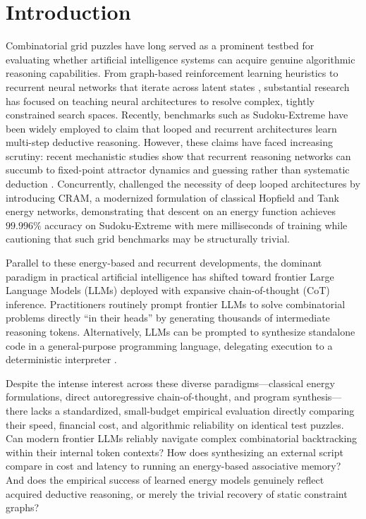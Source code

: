 \documentclass{article} %
\begin{document}
\section{Introduction}
\label{sec:intro}
Combinatorial grid puzzles have long served as a prominent testbed for evaluating whether artificial intelligence systems can acquire genuine algorithmic reasoning capabilities. From graph-based reinforcement learning heuristics \citep{Dai2017LearningCombinatorial} to recurrent neural networks that iterate across latent states \citep{Yang2023LearningSolve}, substantial research has focused on teaching neural architectures to resolve complex, tightly constrained search spaces. Recently, benchmarks such as Sudoku-Extreme have been widely employed to claim that looped and recurrent architectures learn multi-step deductive reasoning. However, these claims have faced increasing scrutiny: recent mechanistic studies show that recurrent reasoning networks can succumb to fixed-point attractor dynamics and guessing rather than systematic deduction \citep{Ren2026YourReasoning}. Concurrently, \citet{Hoover2026ClassicalEnergies} challenged the necessity of deep looped architectures by introducing CRAM, a modernized formulation of classical Hopfield and Tank energy networks, demonstrating that descent on an energy function achieves $99.996\%$ accuracy on Sudoku-Extreme with mere milliseconds of training while cautioning that such grid benchmarks may be structurally trivial.

Parallel to these energy-based and recurrent developments, the dominant paradigm in practical artificial intelligence has shifted toward frontier Large Language Models (LLMs) deployed with expansive chain-of-thought (CoT) inference. Practitioners routinely prompt frontier LLMs to solve combinatorial problems directly ``in their heads'' by generating thousands of intermediate reasoning tokens. Alternatively, LLMs can be prompted to synthesize standalone code in a general-purpose programming language, delegating execution to a deterministic interpreter \citep{Gao2022PalProgramaided, Pan2023LogiclmEmpowering}. 

Despite the intense interest across these diverse paradigms—classical energy formulations, direct autoregressive chain-of-thought, and program synthesis—there lacks a standardized, small-budget empirical evaluation directly comparing their speed, financial cost, and algorithmic reliability on identical test puzzles. Can modern frontier LLMs reliably navigate complex combinatorial backtracking within their internal token contexts? How does synthesizing an external script compare in cost and latency to running an energy-based associative memory? And does the empirical success of learned energy models genuinely reflect acquired deductive reasoning, or merely the trivial recovery of static constraint graphs?
\end{document}
